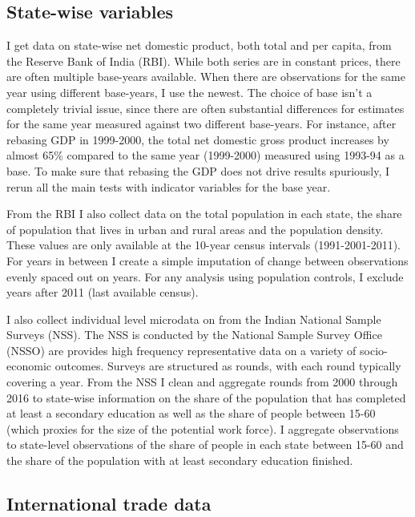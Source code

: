 \documentclass[11pt]{article}
\begin{document}
\subsection{State-wise variables}%
\label{sub:state_wise_variables}

I get data on state-wise net domestic product, both total and per capita, from the Reserve Bank of India (RBI). While both series are in constant prices, there are often multiple base-years available. When there are observations for the same year using different base-years, I use the newest. The choice of base isn't a completely trivial issue, since there are often substantial differences for estimates for the same year measured against two different base-years. For instance, after rebasing GDP in 1999-2000, the total net domestic gross product increases by almost 65\% compared to the same year (1999-2000) measured using 1993-94 as a base. To make sure that rebasing the GDP does not drive results spuriously, I rerun all the main tests with indicator variables for the base year.

From the RBI I also collect data on the total population in each state, the share of population that lives in urban and rural areas and the population density. These values are only available at the 10-year census intervals (1991-2001-2011). For years in between I create a simple imputation of change between observations evenly spaced out on years. For any analysis using population controls, I exclude years after 2011 (last available census).

I also collect individual level microdata on from the Indian National Sample Surveys (NSS). The NSS is conducted by the National Sample Survey Office (NSSO) are provides high frequency representative data on a variety of socio-economic outcomes. Surveys are structured as rounds, with each round typically covering a year. From the NSS I clean and aggregate rounds from 2000 through 2016 to state-wise information on the share of the population that has completed at least a secondary education as well as the share of people between 15-60 (which proxies for the size of the potential work force).
I aggregate observations to state-level observations of the share of people in each state between 15-60 and the share of the population with at least secondary education finished.

\subsection{International trade data}%
\label{sub:international_trade_data}
\end{document}
